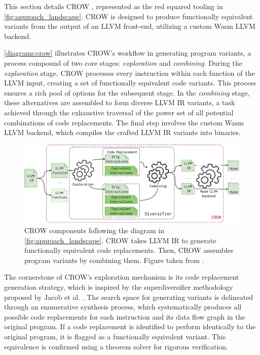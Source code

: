 
\label{section:crow}
\renewcommand{\tool}{CROW\xspace}

This section details CROW \cite{CROW}, represented as the red squared tooling in \autoref{fig:approach_landscape}. 
CROW is designed to produce functionally equivalent \wasm variants from the output of an LLVM front-end, utilizing a custom Wasm LLVM backend.

\autoref{diagrams:crow} illustrates CROW's workflow in generating program variants, a process compound of two core stages: \textit{exploration} and \textit{combining}. 
During the \textit{exploration} stage, CROW processes every instruction within each function of the LLVM input, creating a set of functionally equivalent code variants. 
This process ensures a rich pool of options for the subsequent stage.
In the \textit{combining} stage, these alternatives are assembled to form diverse LLVM IR variants, a task achieved through the exhaustive traversal of the power set of all potential combinations of code replacements. 
The final step involves the custom Wasm LLVM backend, which compiles the crafted LLVM IR variants into \wasm binaries. 


\begin{figure}[h]
    \includegraphics[width=\linewidth]{diagrams/generation/crow.drawio.pdf}
    \caption{CROW components following the diagram in \autoref{fig:approach_landscape}. CROW takes LLVM IR to generate functionally equivalent code replacements. Then, CROW assembles program variants by combining them. Figure taken from \cite{Lic}.}
    \label{diagrams:crow}
\end{figure}



The cornerstone of CROW's exploration mechanism is its code replacement generation strategy, which is inspired by the superdiversifier methodology proposed by Jacob et al. \cite{jacob2008superdiversifier}. 
The search space for generating variants is delineated through an enumerative synthesis process, which systematically produces all possible code replacements for each instruction and its data flow graph in the original program. 
If a code replacement is identified to perform identically to the original program, it is flagged as a functionally equivalent variant.
This equivalence is confirmed using a theorem solver for rigorous verification.

